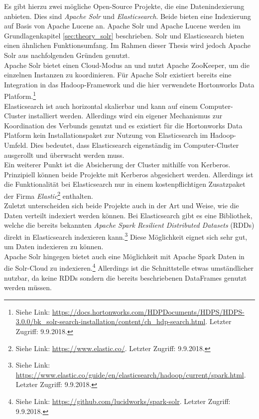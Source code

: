 \noindent 
Es gibt hierzu zwei mögliche Open-Source Projekte, die eine Datenindexierung anbieten. Dies sind \textit{Apache Solr\texttrademark} und \textit{Elasticsearch\texttrademark}. Beide bieten eine Indexierung auf Basis von Apache Lucene an. Apache Solr und Apache Lucene werden im Grundlagenkapitel \ref{sec:theory_solr} beschrieben. Solr und Elasticsearch bieten einen ähnlichen Funktionsumfang. Im Rahmen dieser Thesis wird jedoch Apache Solr aus nachfolgenden Gründen genutzt.\\
Apache Solr bietet einen Cloud-Modus an und nutzt Apache ZooKeeper, um die einzelnen Instanzen zu koordinieren. Für Apache Solr existiert bereits eine Integration in das Hadoop-Framework und die hier verwendete Hortonworks Data Platform.\footnote{Siehe Link: \url{https://docs.hortonworks.com/HDPDocuments/HDPS/HDPS-3.0.0/bk_solr-search-installation/content/ch_hdp-search.html}. Letzter Zugriff: 9.9.2018.}\\
Elasticsearch ist auch horizontal skalierbar und kann auf einem Computer-Cluster installiert werden. Allerdings wird ein eigener Mechanismus zur Koordination des Verbunds genutzt und es existiert für die Hortonworks Data Platform kein Installationspaket zur Nutzung von Elasticsearch im Hadoop-Umfeld. Dies bedeutet, dass Elasticsearch eigenständig im Computer-Cluster ausgerollt und überwacht werden muss.\\

\noindent
Ein weiterer Punkt ist die Absicherung der Cluster mithilfe von Kerberos. Prinzipiell können beide Projekte mit Kerberos abgesichert werden. Allerdings ist die Funktionalität bei Elasticsearch nur in einem kostenpflichtigen Zusatzpaket der Firma \textit{Elastic}\footnote{Siehe Link: \url{https://www.elastic.co/}. Letzter Zugriff: 9.9.2018.} enthalten.\\

\noindent
Zuletzt unterscheiden sich beide Projekte auch in der Art und Weise, wie die Daten verteilt indexiert werden können. Bei Elasticsearch gibt es eine Bibliothek, welche die bereits bekannten \textit{Apache Spark Resilient Distributed Datasets} (RDDs) direkt in Elasticsearch indexieren kann.\footnote{Siehe Link: \url{https://www.elastic.co/guide/en/elasticsearch/hadoop/current/spark.html}. Letzter Zugriff: 9.9.2018.} Diese Möglichkeit eignet sich sehr gut, um Daten indexieren zu können.\\
Apache Solr hingegen bietet auch eine Möglichkeit mit Apache Spark Daten in die Solr-Cloud zu indexieren.\footnote{Siehe Link: \url{https://github.com/lucidworks/spark-solr}. Letzter Zugriff: 9.9.2018.} Allerdings ist die Schnittstelle etwas umständlicher nutzbar, da keine RDDs sondern die bereits beschriebenen DataFrames genutzt werden müssen.\\

